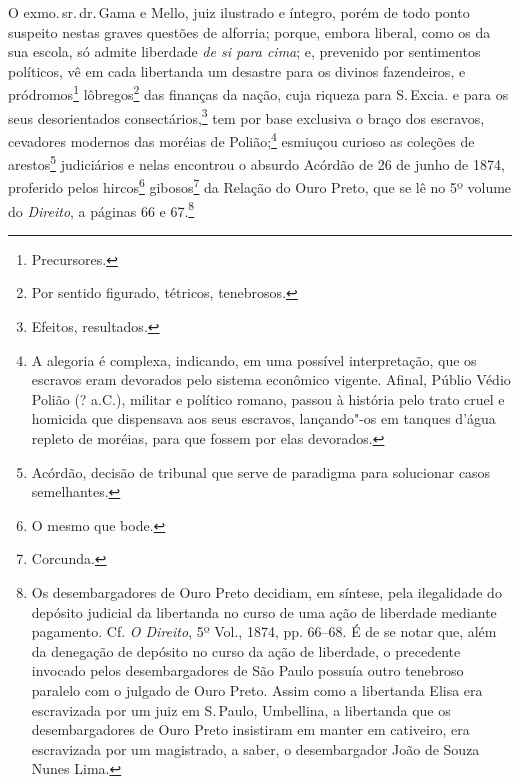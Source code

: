 O exmo.\,sr.\,dr.\,Gama e Mello, juiz ilustrado e íntegro, porém de todo
ponto suspeito nestas graves questões de alforria; porque, embora
liberal, como os da sua escola, só admite liberdade \emph{de si para
cima}; e, prevenido por sentimentos políticos, vê em cada libertanda um
desastre para os divinos fazendeiros, e pródromos\footnote{
  Precursores.} lôbregos\footnote{Por sentido figurado, tétricos,
  tenebrosos.} das finanças da nação, cuja riqueza para S.\,Excia. e para
os seus desorientados consectários,\footnote{Efeitos, resultados.} tem
por base exclusiva o braço dos escravos, cevadores modernos das moréias
de Polião;\footnote{A alegoria é complexa, indicando, em uma possível
  interpretação, que os escravos eram devorados pelo sistema econômico vigente.
  Afinal, Públio Védio Polião (? a.C.), militar e político romano,
  passou à história pelo trato cruel e homicida que dispensava aos seus
  escravos, lançando"-os em tanques d'água repleto de moréias, para que
  fossem por elas devorados.} esmiuçou curioso as coleções de
arestos\footnote{Acórdão, decisão de tribunal que serve de paradigma
  para solucionar casos semelhantes.} judiciários e nelas encontrou o
absurdo Acórdão de 26 de junho de 1874, proferido pelos hircos\footnote{
  O mesmo que bode.} gibosos\footnote{Corcunda.} da Relação do Ouro
Preto, que se lê no 5º volume do \emph{Direito}, a páginas 66 e
67.\footnote{Os desembargadores de Ouro Preto decidiam, em síntese,
  pela ilegalidade do depósito judicial da libertanda no curso de uma
  ação de liberdade mediante pagamento. Cf. \emph{O Direito}, 5º Vol.,
  1874, pp. 66--68. É de se notar que, além da denegação de depósito no
  curso da ação de liberdade, o precedente invocado pelos
  desembargadores de São Paulo possuía outro tenebroso paralelo com o
  julgado de Ouro Preto. Assim como a libertanda Elisa era escravizada
  por um juiz em S.\,Paulo, Umbellina, a libertanda que os
  desembargadores de Ouro Preto insistiram em manter em cativeiro, era
  escravizada por um magistrado, a saber, o desembargador João de Souza
  Nunes Lima.}

